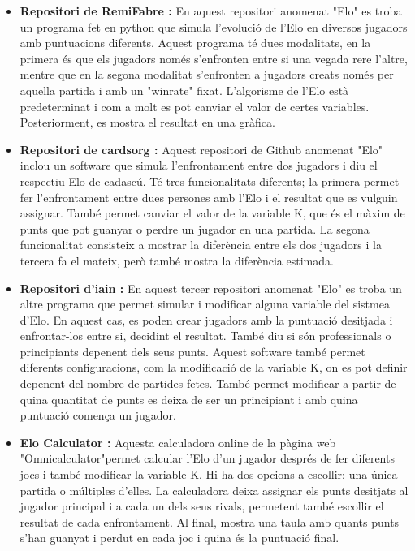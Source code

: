 \documentclass[a4paper]{article}
\begin{document}
\begin{itemize}
    \item \textbf{Repositori de RemiFabre \cite{EloSystemRemi}:} En aquest repositori anomenat "Elo" \space es troba un programa fet en python que simula l'evolució de l'Elo en diversos jugadors amb puntuacions diferents. Aquest programa té dues modalitats, en la primera és que els jugadors només s'enfronten entre si una vegada rere l'altre, mentre que en la segona modalitat s'enfronten a jugadors creats només per aquella partida i amb un "winrate" \space fixat. L'algorisme de l'Elo està predeterminat i com a molt es pot canviar el valor de certes variables. Posteriorment, es mostra el resultat en una gràfica. 
    
    \item \textbf{Repositori de cardsorg \cite{EloSystemCardsorg}:} Aquest repositori de Github anomenat "Elo" \space inclou un software que simula l'enfrontament entre dos jugadors i diu el respectiu Elo de cadascú. Té tres funcionalitats diferents; la primera permet fer l'enfrontament entre dues persones amb l'Elo i el resultat que es vulguin assignar. També permet canviar el valor de la variable K, que és el màxim de punts que pot guanyar o perdre un jugador en una partida. La segona funcionalitat consisteix a mostrar la diferència entre els dos jugadors i la tercera fa el mateix, però també mostra la diferència estimada.
    
    \item \textbf{Repositori d'iain \cite{EloSystemiain}:} En aquest tercer repositori anomenat "Elo" \space es troba un altre programa que permet simular i modificar alguna variable del sistmea d'Elo. En aquest cas, es poden crear jugadors amb la puntuació desitjada i enfrontar-los entre si, decidint el resultat. També diu si són professionals o principiants depenent dels seus punts. Aquest software també permet diferents configuracions, com la modificació de la variable K, on es pot definir depenent del nombre de partides fetes. També permet modificar a partir de quina quantitat de punts es deixa de ser un principiant i amb quina puntuació comença un jugador.
    
    \item \textbf{Elo Calculator \cite{EloSystemOmnicalculator}:} Aquesta calculadora online de la pàgina web "Omnicalculator"\space permet calcular l'Elo d'un jugador després de fer diferents jocs i també modificar la variable K. Hi ha dos opcions a escollir: una única partida o múltiples d'elles. La calculadora deixa assignar els punts desitjats al jugador principal i a cada un dels seus rivals, permetent també escollir el resultat de cada enfrontament. Al final, mostra una taula amb quants punts s'han guanyat i perdut en cada joc i quina és la puntuació final.
\end{itemize}
\end{document}
